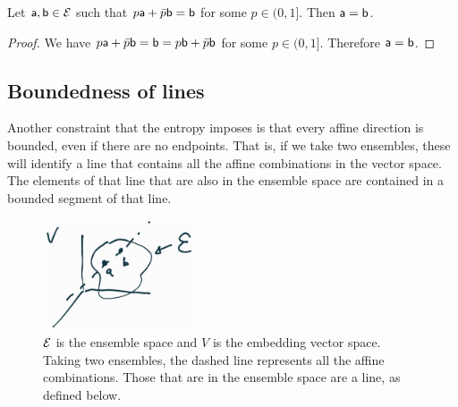 \begin{mathSection}
	\begin{coro}
		Let $\ens[a], \ens[b] \in \Ens$ such that $p\ens[a] + \bar{p} \ens[b] = \ens[b]$ for some $p \in (0,1]$. Then $\ens[a] = \ens[b]$. 
	\end{coro}
	
	\begin{proof}
		We have $p\ens[a] + \bar{p} \ens[b] = \ens[b] = p\ens[b] + \bar{p} \ens[b]$ for some $p \in (0,1]$. Therefore $\ens[a] = \ens[b]$.
	\end{proof}
\end{mathSection}

\subsection{Boundedness of lines}

Another constraint that the entropy imposes is that every affine direction is bounded, even if there are no endpoints. That is, if we take two ensembles, these will identify a line that contains all the affine combinations in the vector space. The elements of that line that are also in the ensemble space are contained in a bounded segment of that line.

\begin{figure}[h]
	\centering
	\includegraphics[width=0.4\textwidth]{tempimages/BoundedEnsembleSpace.jpg}
	\caption{$\Ens$ is the ensemble space and $V$ is the embedding vector space. Taking two ensembles, the dashed line represents all the affine combinations. Those that are in the ensemble space are a line, as defined below.}
\end{figure}

